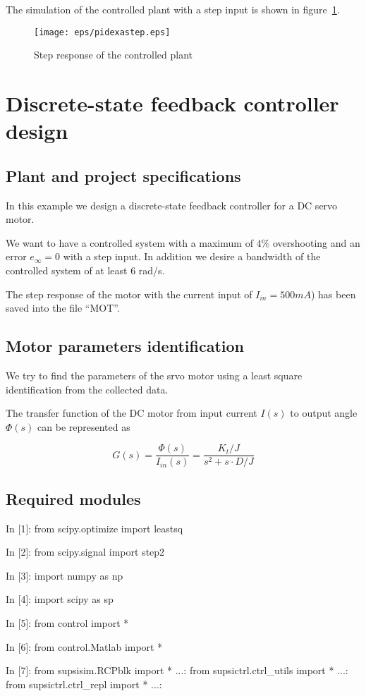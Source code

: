 The simulation of the controlled plant with a step input is shown in 
figure~\ref{F14}.

\begin{figure}[htbp]	%
\centering
\texttt{[image: eps/pidexastep.eps]}
\caption{Step response of the controlled plant}
\label{F14}
\end{figure}

\section{Discrete-state feedback controller design}

\subsection{Plant and project specifications}

In this example we design a discrete-state feedback controller for a DC servo 
motor. 

We want to have a controlled system with a maximum of $4\%$ 
overshooting and an error $e_{\infty}=0$ with a step input. In addition we 
desire a bandwidth of the controlled system of at least $6$ rad/s.

The step response of the motor with the current input of $I_{in}=500mA$) has 
been saved into the file ``MOT''.

\subsection{Motor parameters identification}

We try to find the parameters of the srvo motor using a least square 
identification from the collected data.

The transfer function of the DC motor from input current $I(s)$ to output angle 
$\Phi(s)$ can be represented as

$$
G(s)=\frac{\Phi(s)}{I_{in}(s)}=\frac{K_t/J}{s^2 + s \cdot D/J}
$$

\subsection{Required modules}

\begin{code}
In [1]: from scipy.optimize import leastsq

In [2]: from scipy.signal import step2

In [3]: import numpy as np

In [4]: import scipy as sp

In [5]: from control import *

In [6]: from control.Matlab import *

In [7]: from supsisim.RCPblk import *
   ...: from supsictrl.ctrl_utils import *
   ...: from supsictrl.ctrl_repl import *
   ...: 

\end{code}


